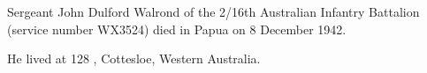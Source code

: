 
Sergeant John Dulford Walrond of the 2/16th Australian Infantry Battalion\cite{WestAust1943, AWMJohnWalrond} (service number WX3524)
died in Papua on 8 December 1942.\cite{AWMJohnWalrond}

He lived at 128 , Cottesloe, Western Australia.\cite{WestAust1943}

